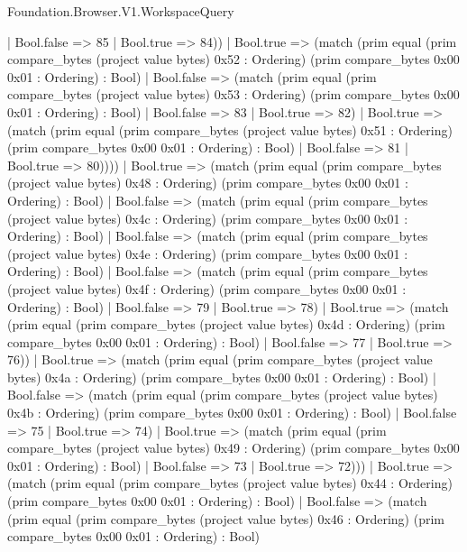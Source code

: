 \begin{lexlean}{Foundation.Browser.V1.WorkspaceQuery}
\begin{semanticmodule}
{                    | Bool.false => 85
                    | Bool.true => 84))
                | Bool.true => (match (prim equal (prim compare_bytes (project value bytes) 0x52 : Ordering) (prim compare_bytes 0x00 0x01 : Ordering) : Bool)
                  | Bool.false => (match (prim equal (prim compare_bytes (project value bytes) 0x53 : Ordering) (prim compare_bytes 0x00 0x01 : Ordering) : Bool)
                    | Bool.false => 83
                    | Bool.true => 82)
                  | Bool.true => (match (prim equal (prim compare_bytes (project value bytes) 0x51 : Ordering) (prim compare_bytes 0x00 0x01 : Ordering) : Bool)
                    | Bool.false => 81
                    | Bool.true => 80))))
            | Bool.true => (match (prim equal (prim compare_bytes (project value bytes) 0x48 : Ordering) (prim compare_bytes 0x00 0x01 : Ordering) : Bool)
              | Bool.false => (match (prim equal (prim compare_bytes (project value bytes) 0x4c : Ordering) (prim compare_bytes 0x00 0x01 : Ordering) : Bool)
                | Bool.false => (match (prim equal (prim compare_bytes (project value bytes) 0x4e : Ordering) (prim compare_bytes 0x00 0x01 : Ordering) : Bool)
                  | Bool.false => (match (prim equal (prim compare_bytes (project value bytes) 0x4f : Ordering) (prim compare_bytes 0x00 0x01 : Ordering) : Bool)
                    | Bool.false => 79
                    | Bool.true => 78)
                  | Bool.true => (match (prim equal (prim compare_bytes (project value bytes) 0x4d : Ordering) (prim compare_bytes 0x00 0x01 : Ordering) : Bool)
                    | Bool.false => 77
                    | Bool.true => 76))
                | Bool.true => (match (prim equal (prim compare_bytes (project value bytes) 0x4a : Ordering) (prim compare_bytes 0x00 0x01 : Ordering) : Bool)
                  | Bool.false => (match (prim equal (prim compare_bytes (project value bytes) 0x4b : Ordering) (prim compare_bytes 0x00 0x01 : Ordering) : Bool)
                    | Bool.false => 75
                    | Bool.true => 74)
                  | Bool.true => (match (prim equal (prim compare_bytes (project value bytes) 0x49 : Ordering) (prim compare_bytes 0x00 0x01 : Ordering) : Bool)
                    | Bool.false => 73
                    | Bool.true => 72)))
              | Bool.true => (match (prim equal (prim compare_bytes (project value bytes) 0x44 : Ordering) (prim compare_bytes 0x00 0x01 : Ordering) : Bool)
                | Bool.false => (match (prim equal (prim compare_bytes (project value bytes) 0x46 : Ordering) (prim compare_bytes 0x00 0x01 : Ordering) : Bool)
}
\end{semanticmodule}
\end{lexlean}
